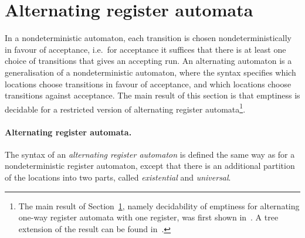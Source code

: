 \section{Alternating register automata}
\label{sec:alternating-automata}
In a nondeterministic automaton, each transition is chosen nondeterministically in favour of acceptance, i.e.~for acceptance it suffices that there is at least one choice of transitions that gives an accepting run. An alternating automaton is a generalisation of a nondeterministic automaton, where the syntax specifies which locations choose transitions in favour of acceptance, and which locations choose transitions against acceptance. The main result of this section is that emptiness is decidable for a restricted version of alternating register automata\footnote{The main result of Section~\ref{sec:alternating-automata}, namely decidability of emptiness for alternating one-way register automata with one register, was first shown in~\cite{DBLP:journals/tocl/DemriL09}. A tree extension of the result can be found in~\cite{DBLP:journals/tocl/JurdzinskiL11}.}. 


 
\paragraph*{Alternating register automata.}
The syntax of an \emph{alternating register automaton} is defined the same way as for a nondeterministic register automaton, except that there is an additional partition of the locations into two parts, called \emph{existential} and \emph{universal}. 

